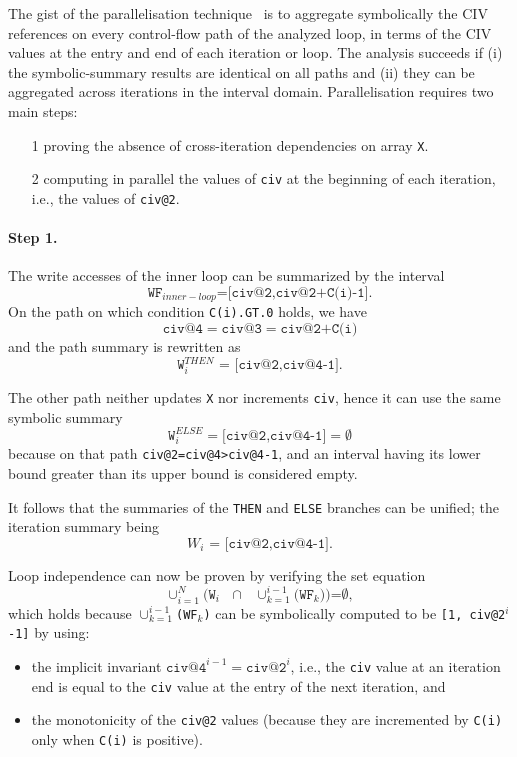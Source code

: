 The gist of the parallelisation technique~\cite{CIVan} is to aggregate
symbolically the CIV references on every control-flow path of the
analyzed loop, in terms of the CIV values at the entry and end of each
iteration or loop.  The analysis succeeds if (i) the symbolic-summary
results are identical on all paths and (ii) they can be aggregated
across iterations in the interval domain.
%
Parallelisation requires two main steps:
\begin{itemize}
    \item[1] proving the absence of cross-iteration dependencies 
        on array \texttt{X}. 
    \item[2] computing in parallel the values of \texttt{civ}
    at the beginning of each iteration, i.e., the values of \texttt{civ@2}. 
\end{itemize}

\paragraph{Step 1.} 
The write accesses of the inner loop can be summarized
by the interval
\[
  \texttt{WF$_{inner-loop}$=[civ@2,civ@2+C(i)-1]}.
\]
On the path on which condition \texttt{C(i).GT.0} holds, we have
\[
  \texttt{civ@4$=$civ@3$=$civ@2+C(i)}
\]
and the path summary is
rewritten as
\[
  \texttt{W$_i^{THEN}$ = [civ@2,civ@4-1]}.
\]

The other path neither updates \texttt{X} nor increments \texttt{civ},
hence it can use the same symbolic summary
\[
  \texttt{W}_i^{ELSE} = \texttt{[civ@2,civ@4-1]} = \emptyset
  \]
because on that path \texttt{civ@2=civ@4>civ@4-1}, and an interval
having its lower bound greater than its upper bound is considered
empty.

It follows that the summaries of the \texttt{THEN} and \texttt{ELSE} branches
can be unified; the iteration summary being
\[
  \texttt{$W_i$~=~[civ@2,civ@4-1]}.
\]

Loop independence can now be proven by verifying the set equation
\[
  \texttt{$\cup_{i=1}^{N}$(W$_i$ $\cap$ $\cup_{k=1}^{i-1}$(WF$_k$))=$\emptyset$},
\]
which holds because \texttt{$\cup_{k=1}^{i-1}$(WF$_k$)} can be symbolically
computed to be \texttt{[1, civ@2$^i$-1]} by using:
\begin{itemize}
\item the implicit invariant
  $\texttt{civ@4}^{i-1}=\texttt{civ@2}^{i}$, i.e., the \texttt{civ}
  value at an iteration end is equal to the \texttt{civ} value at the
  entry of the next iteration, and
\item the monotonicity of the \texttt{civ@2} values (because they are
  incremented by \texttt{C(i)} only when \texttt{C(i)} is positive).
\end{itemize}

